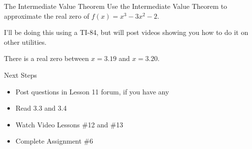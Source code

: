 \documentclass{beamer}
\begin{document}
\begin{frame}[t]{The Intermediate Value Theorem}
Use the Intermediate Value Theorem to approximate the real zero of $f(x) = x^3 - 3x^2 - 2$.

I'll be doing this using a TI-84, but will post videos showing you how to do it on other utilities.

\pause

There is a real zero between $x = 3.19$ and $x = 3.20$.
\end{frame}

\begin{frame}[t]{Next Steps}
\begin{itemize}
\item Post questions in Lesson 11 forum, if you have any
\item Read 3.3 and 3.4
\item Watch Video Lessons \#12 and \#13
\item Complete Assignment \#6
\end{itemize}
\end{frame}
\end{document}

